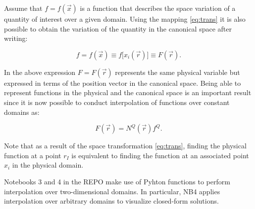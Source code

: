 Assume that $f=f(\overrightarrow x)$ is a function that describes the space variation of a quantity of interest over a given domain.  Using  the mapping \ref{eq:trans} it is also possible to obtain the variation of the quantity in the canonical space after writing:


\[ f=f(\overrightarrow x)\equiv f\lbrack x_i(\overrightarrow r)\rbrack\equiv F(\overrightarrow r). \]

In the above expression $F = F(\overrightarrow r)$ represents the same physical variable but expressed in terms of the position vector in the canonical space. Being able to represent functions in the physical and the canonical space is an important result since it is now possible to conduct interpolation of functions over constant domains as:

\begin{equation}
F(\overrightarrow r)=N^Q(\overrightarrow r)f^Q.
\label{eq:trans_inter}
\end{equation}

Note that as a result of the space transformation \ref{eq:trans}, finding the physical function at a point $r_I$ is equivalent to finding the function at an associated point $x_i$ in the physical domain.


\begin{tcolorbox}

Notebooks 3 and 4 in the REPO make use of Pyhton functions to perform interpolation over two-dimensional domains. In particular, NB4 applies interpolation over arbitrary domains to visualize closed-form solutions.

\end{tcolorbox}

%
